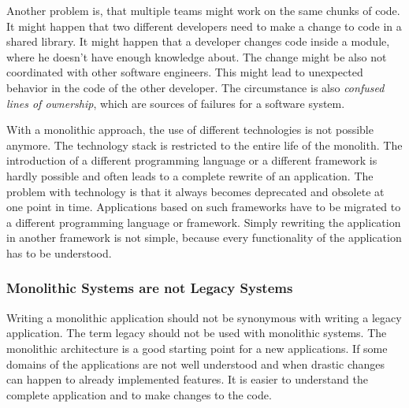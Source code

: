 \bigskip

\noindent Another problem is, that multiple teams might work on the same chunks of code. It might happen that two different developers need to make a change to code in a shared library. It might happen that a developer changes code inside a module, where he doesn't have enough knowledge about. The change might be also not coordinated with other software engineers. This might lead to unexpected behavior in the code of the other developer. The circumstance is also \textit{confused lines of ownership}, which are sources of failures for a software system. \cite[15]{book:2019:newman:background:monolith:monolith-to-microservices} \cite[7]{inproceedings:2011:bird:background:monoliths:dont-touch-my-code}

\bigskip

\noindent With a monolithic approach, the use of different technologies is not possible anymore. The technology stack is restricted to the entire life of the monolith. The introduction of a different programming language or a different framework is hardly possible and often leads to a complete rewrite of an application. \cite[6-7]{book:2018:richardson:background:bff:microservices-patterns} The problem with technology is that it always becomes deprecated and obsolete at one point in time. Applications based on such frameworks have to be migrated to a different programming language or framework. Simply rewriting the application in another framework is not simple, because every functionality of the application has to be understood.

\subsubsection{Monolithic Systems are not Legacy Systems}\label{subsection:background:software-monolith:not-legacy-systems}

Writing a monolithic application should not be synonymous with writing a legacy application. The term legacy should not be used with monolithic systems. \cite[15]{book:2019:newman:background:monolith:monolith-to-microservices} The monolithic architecture is a good starting point for a new applications. If some domains of the applications are not well understood and when drastic changes can happen to already implemented features. It is easier to understand the complete application and to make changes to the code. \cite[43]{book:2019:newman:background:monolith:monolith-to-microservices}
